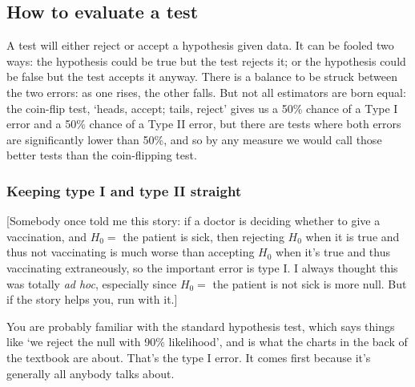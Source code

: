 \subsection{How to evaluate a test}

A test will either reject or accept a hypothesis given data. It can be
fooled two ways: the hypothesis could be true but the test rejects it;
or the hypothesis could be false but the test accepts it anyway. There
is a balance to be struck between the two errors: as one rises, the
other falls. But not all estimators are born equal: the coin-flip test, `heads, accept;
tails, reject' gives us a 50\% chance of a Type I error
and a 50\% chance of a Type II error, but there are tests where both
errors are significantly lower than 50\%, and so by any measure we would
call those better tests than the coin-flipping test. 


\subsubsection{Keeping type I and type II straight} 
[Somebody once told me this story: if a doctor is deciding
whether to give a vaccination, and $H_0=$ the patient is sick,
then rejecting $H_0$ when it is true and thus not vaccinating is much worse than accepting
$H_0$ when it's true and thus vaccinating extraneously, so the important error is type I. I always
thought this was totally {\it ad hoc}, especially since $H_0=$
the patient is not sick is more null. But if the story helps you, run
with it.]

You are probably familiar with the
standard hypothesis test, which says things like `we reject the null with 90\%
likelihood', and is what the charts in the back of the textbook are about.
That's the type I error. It comes first because
it's generally all anybody talks about.


